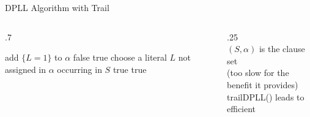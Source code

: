 \documentclass[t]{sdqbeamer}
\begin{document}
\begin{frame}{DPLL Algorithm with Trail}
	\centering
	\begin{minipage}{0.95\textwidth}
		\begin{columns}[T]
			\begin{column}{.7\linewidth}
				\begin{algorithm}[H]
					\DontPrintSemicolon
					\caption{trailDPLL(ClauseSet $S$, PartialAssignment $\alpha$)}
					 {
						add $\{ L = 1 \}$ to $\alpha$ 
					}
					 { 
						\Return false  
					}
					 { 
						\Return true  
					}
					choose a literal $L$ not assigned in $\alpha$ occurring in $S$ 
					 { 
						\Return true  
					}
					 { 
						\Return true  
					}
				\end{algorithm}
			\end{column}
			\begin{column}{.25\linewidth}
				~\\[1em]
				$(S,\alpha)$ is the clause set \\[1em]
				 (too slow for the benefit it provides)\\[1em]
				\textsf{trailDPLL()} leads to efficient 
			\end{column}
		\end{columns}
	\end{minipage}
\end{frame}
\end{document}
